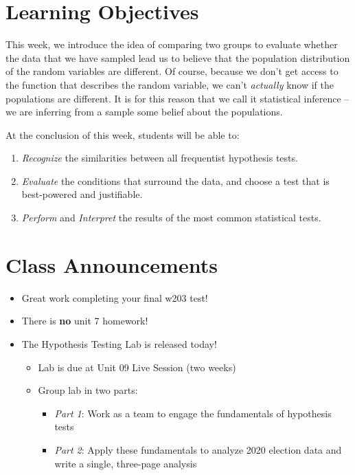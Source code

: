\documentclass[
]{book}
\providecommand{\tightlist}{%
  \setlength{\itemsep}{0pt}\setlength{\parskip}{0pt}}
\theoremstyle{definition}
\theoremstyle{definition}
\theoremstyle{definition}
\theoremstyle{definition}
\theoremstyle{remark}
\begin{document}
\hypertarget{learning-objectives-6}{%
\section{Learning Objectives}\label{learning-objectives-6}}

This week, we introduce the idea of comparing two groups to evaluate whether the data that we have sampled lead us to believe that the population distribution of the random variables are different. Of course, because we don't get access to the function that describes the random variable, we can't \emph{actually} know if the populations are different. It is for this reason that we call it statistical inference -- we are inferring from a sample some belief about the populations.

At the conclusion of this week, students will be able to:

\begin{enumerate}
\def\labelenumi{\arabic{enumi}.}
\tightlist
\item
  \emph{Recognize} the similarities between all frequentist hypothesis tests.
\item
  \emph{Evaluate} the conditions that surround the data, and choose a test that is best-powered and justifiable.
\item
  \emph{Perform} and \emph{Interpret} the results of the most common statistical tests.
\end{enumerate}

\hypertarget{class-announcements-5}{%
\section{Class Announcements}\label{class-announcements-5}}

\begin{itemize}
\tightlist
\item
  Great work completing your final w203 test!
\item
  There is \textbf{no} unit 7 homework!
\item
  The Hypothesis Testing Lab is released today!

  \begin{itemize}
  \tightlist
  \item
    Lab is due at Unit 09 Live Session (two weeks)
  \item
    Group lab in two parts:

    \begin{itemize}
    \tightlist
    \item
      \emph{Part 1}: Work as a team to engage the fundamentals of hypothesis tests
    \item
      \emph{Part 2}: Apply these fundamentals to analyze 2020 election data and write a single, three-page analysis
    \end{itemize}
  \end{itemize}
\end{itemize}
\end{document}
